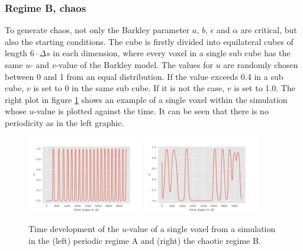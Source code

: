 \subsubsection{Regime B, chaos}
To generate chaos, not only the Barkley parameter $a$, $b$, $\epsilon$ and $\alpha$ are critical, but also the starting conditions. The cube is firstly divided into equilateral cubes of length $6\cdot\Delta s$ in each dimension, where every voxel in a single sub cube has the same $u$- and $v$-value of the Barkley model. The values for $u$ are randomly chosen between 0 and 1 from an equal distribution. If the value exceeds 0.4 in a sub cube, $v$ is set to 0 in the same sub cube. If it is not the case, $v$ is set to 1.0. The right plot in figure \ref{fig:timelines} shows an example of a single voxel within the simulation whose $u$-value is plotted against the time. It can be seen that there is no periodicity as in the left graphic.

\begin{figure}[h]
    \center
    \includegraphics[width=0.45\textwidth]{figures/timeline_periodic.pdf} 
    \includegraphics[width=0.45\textwidth]{figures/timeline_chaotic.pdf} \\
    \caption{Time development of the $u$-value of a single voxel from a simulation in the (left) periodic regime A and (right) the chaotic regime B.}
 \label{fig:timelines}
\end{figure}




